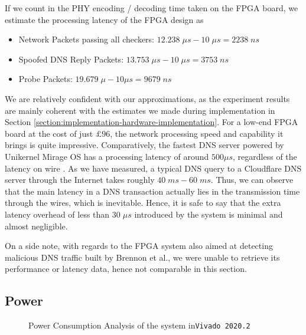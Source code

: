 \documentclass[a4paper]{report}
\newcommand{\code}{\texttt}
\begin{document}
If we count in the PHY encoding / decoding time taken on the FPGA board, we estimate the processing latency of the FPGA design as 
\begin{itemize}[noitemsep]
    \item Network Packets passing all checkers: $12.238\; \mu s - 10\; \mu s= 2238\; ns$
    \item Spoofed DNS Reply Packets: $13.753\; \mu s - 10\; \mu s = 3753\; ns$
    \item Probe Packets: $19.679\; \mu - 10 \mu s = 9679\; ns$
\end{itemize}

We are relatively confident with our approximations, as the experiment results are mainly coherent with the estimates we made during implementation in Section \ref{section:implementation-hardware-implementation}. For a low-end FPGA board at the cost of just $£96$, the network processing speed and capability it brings is quite impressive. Comparatively, the fastest DNS server powered by Unikernel Mirage OS has a processing latency of around $500 \mu s$, regardless of the latency on wire \cite{briggs-2014, madhavapeddy-2013}.  As we have measured, a typical DNS query to a Cloudflare DNS server through the Internet takes roughly $40\;ms - 60\;ms$. Thus, we can observe that the main latency in a DNS transaction actually lies in the transmission time through the wires, which is inevitable. Hence, it is safe to say that the extra latency overhead of less than $30\; \mu s$ introduced by the system is minimal and almost negligible.

On a side note, with regards to the FPGA system also aimed at detecting malicious DNS traffic built by Brennon et al.\cite{thomas-2011}, we were unable to retrieve its performance or latency data, hence not comparable in this section.

\subsection{Power}

\begin{figure}[h!]
  \caption{Power Consumption Analysis of the system in\code{Vivado 2020.2}}
  \label{fig:power-consumption-analysis}
\end{figure}
\end{document}
